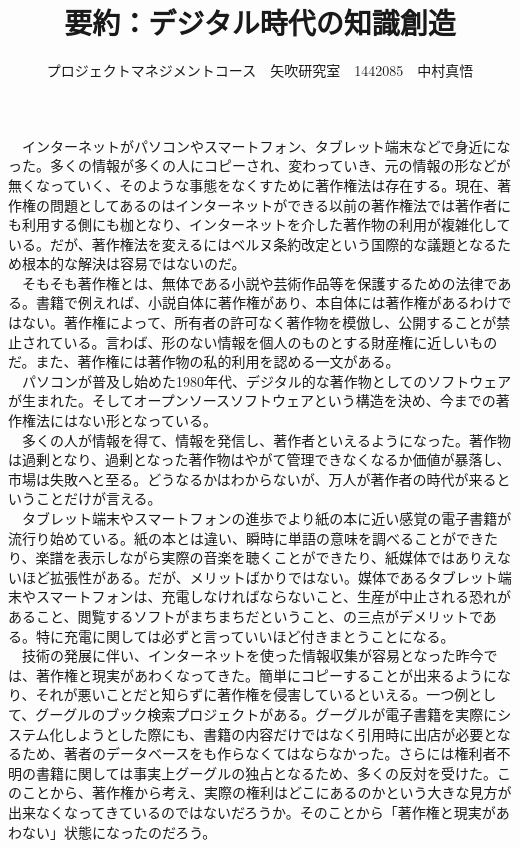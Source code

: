 \documentclass[uplatex,twocolumn,dvipdfmx]{jsarticle}
\title{\vspace{-5mm}\fontsize{14pt}{0pt}\selectfont 要約：デジタル時代の知識創造}
\author{\normalsize プロジェクトマネジメントコース　矢吹研究室　1442085　中村真悟}
\date{}
\begin{document}
\fontsize{10.5pt}{\baselineskip}\selectfont
\maketitle





　インターネットがパソコンやスマートフォン、タブレット端末などで身近になった。多くの情報が多くの人にコピーされ、変わっていき、元の情報の形などが無くなっていく、そのような事態をなくすために著作権法は存在する。現在、著作権の問題としてあるのはインターネットができる以前の著作権法では著作者にも利用する側にも枷となり、インターネットを介した著作物の利用が複雑化している。だが、著作権法を変えるにはベルヌ条約改定という国際的な議題となるため根本的な解決は容易ではないのだ。
\\　そもそも著作権とは、無体である小説や芸術作品等を保護するための法律である。書籍で例えれば、小説自体に著作権があり、本自体には著作権があるわけではない。著作権によって、所有者の許可なく著作物を模倣し、公開することが禁止されている。言わば、形のない情報を個人のものとする財産権に近しいものだ。また、著作権には著作物の私的利用を認める一文がある。
\\　パソコンが普及し始めた1980年代、デジタル的な著作物としてのソフトウェアが生まれた。そしてオープンソースソフトウェアという構造を決め、今までの著作権法にはない形となっている。
\\　多くの人が情報を得て、情報を発信し、著作者といえるようになった。著作物は過剰となり、過剰となった著作物はやがて管理できなくなるか価値が暴落し、市場は失敗へと至る。どうなるかはわからないが、万人が著作者の時代が来るということだけが言える。
\\　タブレット端末やスマートフォンの進歩でより紙の本に近い感覚の電子書籍が流行り始めている。紙の本とは違い、瞬時に単語の意味を調べることができたり、楽譜を表示しながら実際の音楽を聴くことができたり、紙媒体ではありえないほど拡張性がある。だが、メリットばかりではない。媒体であるタブレット端末やスマートフォンは、充電しなければならないこと、生産が中止される恐れがあること、閲覧するソフトがまちまちだということ、の三点がデメリットである。特に充電に関しては必ずと言っていいほど付きまとうことになる。
\\　技術の発展に伴い、インターネットを使った情報収集が容易となった昨今では、著作権と現実があわくなってきた。簡単にコピーすることが出来るようになり、それが悪いことだと知らずに著作権を侵害しているといえる。一つ例として、グーグルのブック検索プロジェクトがある。グーグルが電子書籍を実際にシステム化しようとした際にも、書籍の内容だけではなく引用時に出店が必要となるため、著者のデータベースをも作らなくてはならなかった。さらには権利者不明の書籍に関しては事実上グーグルの独占となるため、多くの反対を受けた。このことから、著作権から考え、実際の権利はどこにあるのかという大きな見方が出来なくなってきているのではないだろうか。そのことから「著作権と現実があわない」状態になったのだろう。
\end{document}
